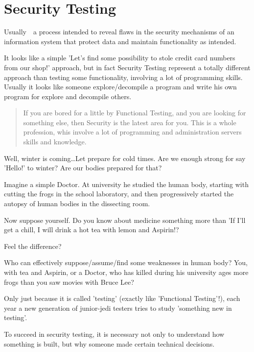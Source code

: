 \section{Security Testing}
\label{sec:Security Testing}

Usually~\textemdash~a process intended to reveal flaws in the security mechanisms of an information system that protect data and maintain functionality as intended.

It looks like a simple 'Let's find some possibility to stole credit card numbers from our shop!' approach, but in fact Security Testing represent a totally different approach than testing some functionality, involving a lot of programming skills. Usually it looks like someone explore/decompile a program and write his own program for explore and decompile others.

\begin{quote}
 If you are bored for a little by Functional Testing, and you are looking for something else, then Security is the latest area for you. This is a whole profession, whis involve a lot of programming and administration servers skills and knowledge.
\end{quote} 

Well, winter is coming\ldots Let prepare for cold times. Are we enough strong for say 'Hello!' to winter? Are our bodies prepared for that?

Imagine a simple Doctor. At university he studied the human body, starting with cutting the frogs in the school laboratory, and then progressively started the autopsy of human bodies in the dissecting room.

Now suppose yourself. Do you know about medicine something more than 'If I'll get a chill, I will drink a hot tea with lemon and Aspirin!?

Feel the difference?

Who can effectively suppose/assume/find some weaknesses in human body? You, with tea and Aspirin, or a Doctor, who has killed during his university ages more frogs than you saw movies with Bruce Lee?

Only just because it is called 'testing' (exactly like 'Functional Testing'!), each year a new generation of junior-jedi testers tries to study 'something new in testing'.

To succeed in security testing, it is necessary not only to understand how something is built, but why someone made certain technical decisions.
